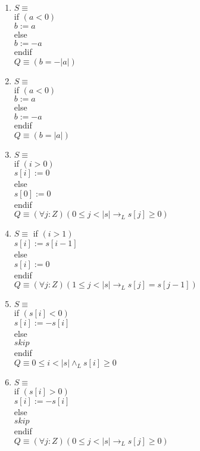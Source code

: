 \documentclass[a4paper]{article}
\begin{document}
\begin{enumerate}[label=\alph*)]
\item $S \equiv$\\
   if $( a < 0 )$\\
      $b := a$\\
   else\\
      $b := -a$\\
   endif\\

   $Q \equiv (b = -|a|)$\\
\item $S \equiv$\\
   if $( a < 0 )$\\
     $ b := a$\\
   else\\
     $ b := -a$\\
   endif\\

   $Q \equiv (b = |a|)$\\

\item $S \equiv$\\
   if $( i > 0 )$\\
     $ s [ i ] := 0$\\
   else\\
     $ s [ 0 ] := 0$\\
   endif\\

   $Q \equiv (\forall j :Z)(0 \leq j < |s| \rightarrow_L s[j] \geq 0)$\\
\item $S \equiv$
   if $( i > 1 )$\\
      $s [ i ] := s [ i -1]$\\
   else\\
     $ s [ i ] := 0$\\
   endif\\

   $Q \equiv (\forall j :Z)(1 \leq j < |s| \rightarrow_L s[j] = s[j - 1])$\\

\item $S \equiv$\\
   if $( s [ i ] < 0 )$\\
     $ s [ i ] := -s [ i ]$\\
   else\\
      $skip$\\
   endif\\

   $Q \equiv 0 \leq i < |s| \wedge_L s[i] \geq 0$\\
\item $S \equiv$\\
   if $( s [ i ] > 0 )$\\
      $s [ i ] := -s [ i ]$\\
   else\\
      $skip$\\
   endif\\

   $Q \equiv (\forall j :Z)(0 \leq j < |s| \rightarrow_L s[j] \geq 0)$
\end{enumerate}
                                                          
\end{document}
